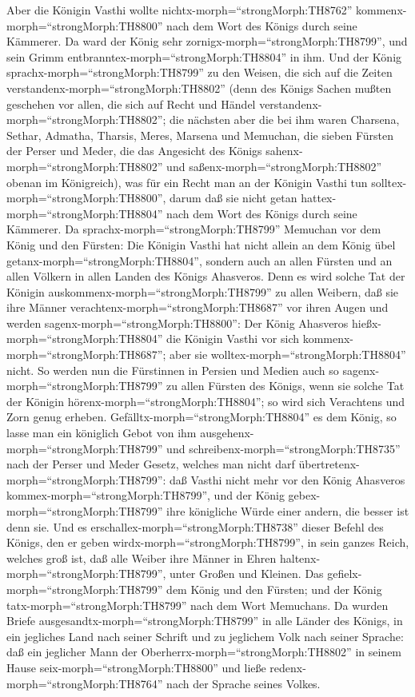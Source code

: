  Aber die Königin Vasthi wollte
nichtx-morph=``strongMorph:TH8762'' kommenx-morph=``strongMorph:TH8800''
nach dem Wort des Königs durch seine Kämmerer. Da ward der König sehr
zornigx-morph=``strongMorph:TH8799'', und sein Grimm
entbranntex-morph=``strongMorph:TH8804'' in ihm.  Und der
König sprachx-morph=``strongMorph:TH8799'' zu den Weisen, die sich auf
die Zeiten verstandenx-morph=``strongMorph:TH8802'' (denn des Königs
Sachen mußten geschehen vor allen, die sich auf Recht und Händel
verstandenx-morph=``strongMorph:TH8802'';  die nächsten
aber die bei ihm waren Charsena, Sethar, Admatha, Tharsis, Meres,
Marsena und Memuchan, die sieben Fürsten der Perser und Meder, die das
Angesicht des Königs sahenx-morph=``strongMorph:TH8802'' und
saßenx-morph=``strongMorph:TH8802'' obenan im Königreich), 
was für ein Recht man an der Königin Vasthi tun
solltex-morph=``strongMorph:TH8800'', darum daß sie nicht getan
hattex-morph=``strongMorph:TH8804'' nach dem Wort des Königs durch seine
Kämmerer.  Da sprachx-morph=``strongMorph:TH8799'' Memuchan
vor dem König und den Fürsten: Die Königin Vasthi hat nicht allein an
dem König übel getanx-morph=``strongMorph:TH8804'', sondern auch an
allen Fürsten und an allen Völkern in allen Landen des Königs Ahasveros.
 Denn es wird solche Tat der Königin
auskommenx-morph=``strongMorph:TH8799'' zu allen Weibern, daß sie ihre
Männer verachtenx-morph=``strongMorph:TH8687'' vor ihren Augen und
werden sagenx-morph=``strongMorph:TH8800'': Der König Ahasveros
hießx-morph=``strongMorph:TH8804'' die Königin Vasthi vor sich
kommenx-morph=``strongMorph:TH8687''; aber sie
wolltex-morph=``strongMorph:TH8804'' nicht.  So werden nun
die Fürstinnen in Persien und Medien auch so
sagenx-morph=``strongMorph:TH8799'' zu allen Fürsten des Königs, wenn
sie solche Tat der Königin hörenx-morph=``strongMorph:TH8804''; so wird
sich Verachtens und Zorn genug erheben. 
Gefälltx-morph=``strongMorph:TH8804'' es dem König, so lasse man ein
königlich Gebot von ihm ausgehenx-morph=``strongMorph:TH8799'' und
schreibenx-morph=``strongMorph:TH8735'' nach der Perser und Meder
Gesetz, welches man nicht darf übertretenx-morph=``strongMorph:TH8799'':
daß Vasthi nicht mehr vor den König Ahasveros
kommex-morph=``strongMorph:TH8799'', und der König
gebex-morph=``strongMorph:TH8799'' ihre königliche Würde einer andern,
die besser ist denn sie.  Und es
erschallex-morph=``strongMorph:TH8738'' dieser Befehl des Königs, den er
geben wirdx-morph=``strongMorph:TH8799'', in sein ganzes Reich, welches
groß ist, daß alle Weiber ihre Männer in Ehren
haltenx-morph=``strongMorph:TH8799'', unter Großen und Kleinen.
 Das gefielx-morph=``strongMorph:TH8799'' dem König und den
Fürsten; und der König tatx-morph=``strongMorph:TH8799'' nach dem Wort
Memuchans.  Da wurden Briefe
ausgesandtx-morph=``strongMorph:TH8799'' in alle Länder des Königs, in
ein jegliches Land nach seiner Schrift und zu jeglichem Volk nach seiner
Sprache: daß ein jeglicher Mann der
Oberherrx-morph=``strongMorph:TH8802'' in seinem Hause
seix-morph=``strongMorph:TH8800'' und ließe
redenx-morph=``strongMorph:TH8764'' nach der Sprache seines Volkes.

